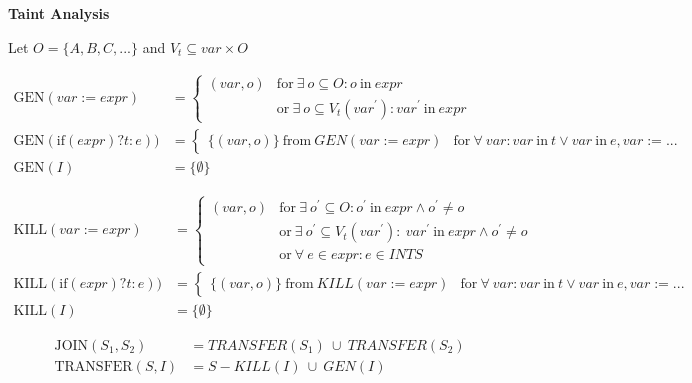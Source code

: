 \documentclass[11pt,letterpaper,roman]{article}
\begin{document}
\centerline{\Large\bf Taint Analysis}
\hfill \par
\hfill \par
\hfill \par


Let $O = \{A,B,C,...\}$ and $V_t \subseteq var \times O$


\begin{equation*}
  \begin{split}
  	\text{GEN}(var := expr) &= 
  	\begin{cases}
  		(var, o) & \text{for}\ \exists\ o \subseteq O: o\ \text{in}\ expr \\
  		& \text{or}\ \exists\ o \subseteq V_t({var}^\prime): {var}^\prime\ \text{in}\ expr
  	\end{cases}\\ 
	\text{GEN}(\text{if}(expr)?t:e)) &=  	
  	\begin{cases}
		\{(var, o)\}\ \text{from}\ GEN(var := expr) & \text{for}\ \forall\ var: var\ \text{in}\ t \vee var\ \text{in}\ e, var := ...
    \end{cases} \\
  	\text{GEN}(I) &= \{\emptyset\}
   \end{split}
\end{equation*}

\begin{equation*}
  \begin{split}
  	\text{KILL}(var := expr) &= 
  	\begin{cases}
  		(var, o) & \text{for}\ \exists\ {o}^\prime \subseteq O: {o}^\prime\ \text{in}\ expr \wedge {o}^\prime \neq o \\
  		& \text{or}\ \exists\ {o}^\prime \subseteq V_t({var}^\prime):\ {var}^\prime\ \text{in}\ expr \wedge {o}^\prime \neq o \\
  		& \text{or}\ \forall\ e \in expr: e \in INTS
  	\end{cases}\\ 
	\text{KILL}(\text{if}(expr)?t:e)) &=  	
  	\begin{cases}
		\{(var, o)\}\ \text{from}\ KILL(var := expr) & \text{for}\ \forall\ var: var\ \text{in}\ t \vee var\ \text{in}\ e, var := ...
    \end{cases} \\
  	\text{KILL}(I) &= \{\emptyset\}
   \end{split}
\end{equation*}

\begin{equation*}
  \begin{split}
  	\text{JOIN}(S_1, S_2) &= TRANSFER(S_1)\ \cup\ TRANSFER(S_2) \\
	\text{TRANSFER}(S, I) &= S - KILL(I)\ \cup\ GEN(I) 	
   \end{split}
\end{equation*}
\end{document}
